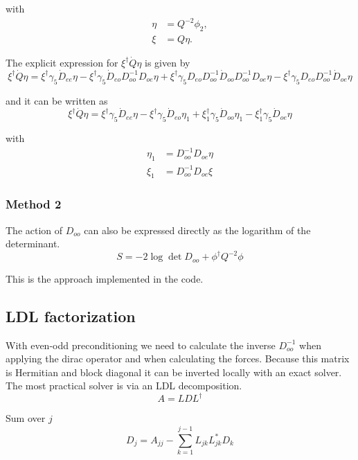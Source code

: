 \documentclass[12pt]{article}
\begin{document}
with
\begin{align}
 \eta &= Q^{-2}\phi_2, \\
 \xi &= Q\eta.
\end{align}

The explicit expression for $\xi^\dagger\dot{Q}\eta$ is given by
\begin{equation}
 \xi^\dagger \dot{Q}\eta
 = \xi^\dagger\gamma_5\dot{D}_{ee}\eta
 - \xi^\dagger\gamma_5\dot{D}_{eo}D_{oo}^{-1}D_{oe}\eta
 + \xi^\dagger\gamma_5D_{eo}D_{oo}^{-1}\dot{D}_{oo}D_{oo}^{-1}D_{oe}\eta
 - \xi^\dagger\gamma_5D_{eo}D_{oo}^{-1}\dot{D}_{oe}\eta
\end{equation}

and it can be written as
\begin{equation}
 \xi^\dagger \dot{Q}\eta
 = \xi^\dagger\gamma_5\dot{D}_{ee}\eta
 - \xi^\dagger\gamma_5\dot{D}_{eo}\eta_1
 + \xi_1^\dagger\gamma_5\dot{D}_{oo}\eta_1
 - \xi_1^\dagger\gamma_5\dot{D}_{oe}\eta
\end{equation}

with
\begin{align}
 \eta_1 &= D_{oo}^{-1}D_{oe}\eta \\
  \xi_1 &= D_{oo}^{-1}D_{oe}\xi
\end{align}

\subsubsection*{Method 2}
The action of $D_{oo}$ can also be expressed directly as the logarithm of the determinant.
\begin{equation}
 S = -2\log\det D_{oo} + \phi^\dagger Q^{-2}\phi
\end{equation}

This is the approach implemented in the code.

\subsection*{LDL factorization}
With even-odd preconditioning we need to calculate the inverse $D_{oo}^{-1}$ when applying the dirac operator and when calculating the forces. Because this matrix is Hermitian and block diagonal it can be inverted locally with an exact solver. The most practical solver is via an LDL decomposition.
\begin{equation}
 A = LDL^\dagger
\end{equation}

Sum over $j$
\begin{equation}
 D_j = A_{jj} - \sum_{k=1}^{j-1}L_{jk}L_{jk}^*D_k
\end{equation}
\end{document}

